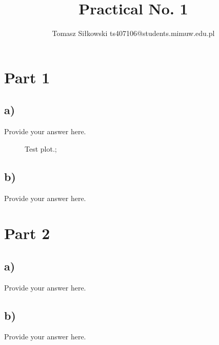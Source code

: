 \documentclass[12pt]{article}
\begin{document}
 
 
\title{Practical No. 1 }%
\author{Tomasz Siłkowski
ts407106@students.mimuw.edu.pl}
 
\maketitle
 
\section{Part 1 }
\subsection*{a) }
Provide your answer here.

\begin{figure}[!h]
\centering
\caption{Test plot.;}
\end{figure}

\subsection*{b) }
Provide your answer here.

 
\section{Part 2 }
\subsection*{a) }
Provide your answer here.

\subsection*{b) }
Provide your answer here. 
 
 
 
\end{document}
